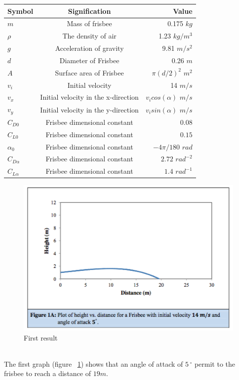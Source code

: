 \documentclass[10pt,a4paper]{report}
\begin{document}
\begin{tabular}{|l|c|r|}
  \hline
  Symbol & Signification & Value \\
  \hline
  $m$ & Mass of frisbee & 0.175 $kg$\\
  $\rho$ & The density of air & 1.23 $kg/m^3$\\
  $g$ & Acceleration of gravity & 9.81 $m/s^2$ \\
  $d$ & Diameter of Frisbee & 0.26 $m$ \\
  $A$ & Surface area of Frisbee & $\pi (d/2)^2$ $m^2$ \\
  $v_i$ & Initial velocity & 14 $m/s$ \\
  $v_x$ & Initial velocity in the x-direction & $v_icos(\alpha)$ $m/s$ \\
  $v_y$ & Initial velocity in the y-direction & $v_isin(\alpha)$ $m/s$ \\
  $C_{D0}$ & Frisbee dimensional constant & $0.08$ \\
  $C_{L0}$ & Frisbee dimensional constant & $0.15$ \\
  $\alpha_0$ & Frisbee dimensional constant & $-4\pi / 180$ $rad$ \\
  $C_{D\alpha}$ & Frisbee dimensional constant & $2.72$ $rad^{-2}$\\
  $C_{L\alpha}$ & Frisbee dimensional constant & $1.4 $ $rad^{-1}$\\
  
  \hline
\end{tabular}
\begin{figure}[!h]
 \centering
\includegraphics[scale=0.6]{graph1.jpg}
\caption{First result}
\label{First result}
\end{figure}
\\The first graph (figure ~\ref{First result}) shows that an angle of attack of $5\,^{\circ}$ permit to the frisbee to reach a distance of $19m$.
\end{document}
